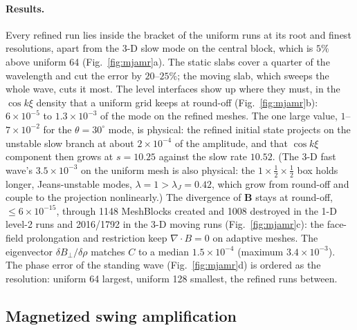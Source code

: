 \documentclass[11pt]{article}
\begin{document}
\paragraph{Results.} Every refined run lies inside the bracket of the uniform runs at its
root and finest resolutions, apart from the 3-D slow mode on the central block, which is
$5\%$ above uniform 64 (Fig.~\ref{fig:mjamr}a). The static slabs cover a quarter of the
wavelength and cut the error by $20$--$25\%$; the moving slab, which sweeps the whole wave,
cuts it most. The level interfaces show up where they must, in the
$\cos k\xi$ density that a uniform grid keeps at round-off (Fig.~\ref{fig:mjamr}b): $6\times
10^{-5}$ to $1.3\times10^{-3}$ of the mode on the refined meshes. The one large value,
$1$--$7\times10^{-2}$ for the $\theta = 30^\circ$ mode, is physical: the refined initial state
projects on the unstable slow branch at about $2\times10^{-4}$ of the amplitude, and that
$\cos k\xi$ component then grows at $s = 10.25$ against the slow rate $10.52$. (The 3-D fast wave's $3.5\times10^{-3}$
on the uniform mesh is also physical: the $1\times\frac12\times\frac12$ box holds longer,
Jeans-unstable modes, $\lambda = 1 > \lambda_J = 0.42$, which grow from round-off and couple
to the projection nonlinearly.) The divergence of $\mathbf B$ stays at round-off,
$\le 6\times10^{-15}$, through 1148 MeshBlocks created and 1008 destroyed in the 1-D level-2
runs and 2016/1792 in the 3-D moving runs (Fig.~\ref{fig:mjamr}c): the face-field
prolongation and restriction keep $\nabla\!\cdot\!B = 0$ on adaptive meshes. The eigenvector
$\delta B_\perp/\delta\rho$ matches $C$ to a median $1.5\times10^{-4}$ (maximum
$3.4\times10^{-3}$). The phase error of the standing wave (Fig.~\ref{fig:mjamr}d) is ordered
as the resolution: uniform 64 largest, uniform 128 smallest, the refined runs between.

\subsection{Magnetized swing amplification}
\label{sec:swing_mhd}
\end{document}
